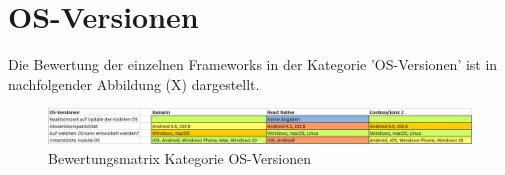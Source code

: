 \section{OS-Versionen}

Die Bewertung der einzelnen Frameworks in der Kategorie 'OS-Versionen' ist in nachfolgender Abbildung (X) dargestellt.

\begin{figure}[h]
	\centering
	\includegraphics[width=1\textwidth]{Bilder/Auswertung_OSVersionen.PNG}
	\caption{Bewertungsmatrix Kategorie OS-Versionen}
	\label{fig:AuswOSVersionen}
\end{figure}

